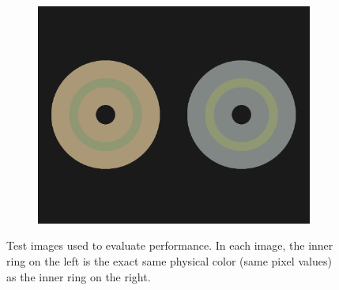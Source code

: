 \documentclass[journal,onecolumn]{IEEEtran}
\begin{document}
\begin{figure}[!htbp]
\begin{subfigure}[b]{0.5\textwidth}
            \caption{}
            \label{img:test-circle-c}
    \end{subfigure}\\
    \begin{subfigure}[b]{0.5\textwidth}
            \centering
            \includegraphics[width=.85\linewidth]{test-circle-d}
            \caption{}
            \label{img:test-circle-d}
    \end{subfigure}
    \caption{Test images used to evaluate performance. In each image, the inner ring on the left is the exact same physical color (same pixel values) as the inner ring on the right.}
\end{figure}
\end{document}
